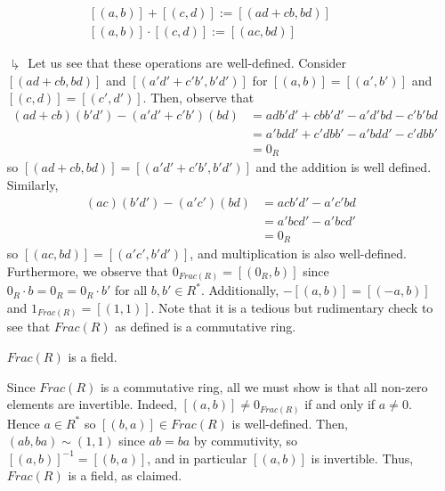 \documentclass[12pt, a4paper, twoside, openright, titlepage]{book}
\begin{document}
\begin{cons}{}{}
\begin{enumerate}
\begin{equation}
            \begin{array}{l}
                [(a,b)] + [(c,d)] := [(ad+cb,bd)] \\
                {[(a,b)]}\cdot [(c,d)] := [(ac,bd)] 
            \end{array}
        \end{equation}
    \end{enumerate}
    \begin{enumerate}
        \item[$\drsh$] Let us see that these operations are well-defined. Consider $[(ad+cb,bd)]$ and $[(a'd'+c'b',b'd')]$ for $[(a,b)] = [(a',b')]$ and $[(c,d)] = [(c',d')]$. Then, observe that \begin{align*}
            (ad+cb)(b'd') - (a'd'+c'b')(bd) &= adb'd'+cbb'd' - a'd'bd - c'b'bd \\
            &= a'bdd' + c'dbb' - a'bdd' - c'dbb' \\
            &= 0_R
        \end{align*}
        so $[(ad+cb,bd)]=[(a'd'+c'b',b'd')]$ and the addition is well defined. Similarly, \begin{align*}
            (ac)(b'd')-(a'c')(bd) &= acb'd'-a'c'bd \\
            &= a'bcd' - a'bcd' \\
            &= 0_R
        \end{align*}
        so $[(ac,bd)] = [(a'c',b'd')]$, and multiplication is also well-defined. Furthermore, we observe that $0_{Frac(R)} = [(0_R,b)]$ since $0_R\cdot b = 0_R = 0_R \cdot b'$ for all $b,b' \in R^*$. Additionally, $-[(a,b)] = [(-a,b)]$ and $1_{Frac(R)} = [(1,1)]$. Note that it is a tedious but rudimentary check to see that $Frac(R)$ as defined is a commutative ring.
        \begin{claim}{}{}
            $Frac(R)$ is a field.
            \begin{proof*}{}{}
                    Since $Frac(R)$ is a commutative ring, all we must show is that all non-zero elements are invertible. Indeed, $[(a,b)] \neq 0_{Frac(R)}$ if and only if $a \neq 0$. Hence $a \in R^*$ so $[(b,a)] \in Frac(R)$ is well-defined. Then, $(ab,ba) \sim (1,1)$ since $ab = ba$  by commutivity, so $[(a,b)]^{-1} = [(b,a)]$, and in particular $[(a,b)]$ is invertible. Thus, $Frac(R)$ is a field, as claimed.
            \end{proof*}
        \end{claim}
    \end{enumerate}
\end{cons}
\end{document}

